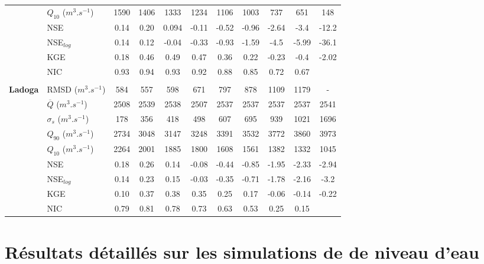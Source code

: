 \begin{table}[b!]
\begin{tabular*}{\linewidth}{ @{\extracolsep{\fill}} ll *{9}c @{}}
                         & $Q_{10}$ ($m^{3}.s^{-1}$) & 1590 & 1406 & 1333 & 1234 & 1106 & 1003 & 737 & 651 & 148  \\
                         & NSE & 0.14 & 0.20 & 0.094 & -0.11 & -0.52 & -0.96 & -2.64 & -3.4 & -12.2 \\
                         & NSE$_{log}$ & 0.14 & 0.12 & -0.04 & -0.33 & -0.93 & -1.59 & -4.5 & -5.99 & -36.1 \\
                         & KGE & 0.18 & 0.46 & 0.49 & 0.47 & 0.36 & 0.22 & -0.23 & -0.4 & -2.02  \\
                         & NIC&0.93&0.94&0.93&0.92&0.88&0.85&0.72&0.67\\
                         \midrule \addlinespace \\
\multirow{9}{*}{\textbf{Ladoga}} & RMSD ($m^{3}.s^{-1}$) & 584 & 557 & 598 & 671 & 797 & 878 & 1109 & 1179 & - \\
                         & $\overline{Q}$ ($m^{3}.s^{-1}$) & 2508 & 2539 & 2538 & 2507 & 2537 & 2537 & 2537 & 2537 & 2541  \\
                         & $\sigma_{s}$ ($m^{3}.s^{-1}$) & 178 & 356 & 418 & 498 & 607 & 695 & 939 & 1021 & 1696\\
                         & $Q_{90}$ ($m^{3}.s^{-1}$) & 2734 & 3048 & 3147 & 3248 & 3391 & 3532 & 3772 & 3860 & 3973 \\
                         & $Q_{10}$ ($m^{3}.s^{-1}$) & 2264 & 2001 & 1885 & 1800 & 1608 & 1561 & 1382 & 1332 & 1045  \\
                         & NSE & 0.18 & 0.26 & 0.14 & -0.08 & -0.44 & -0.85 & -1.95 & -2.33 & -2.94 \\
                         & NSE$_{log}$ & 0.14 & 0.23 & 0.15 & -0.03 & -0.35 & -0.71 & -1.78 & -2.16 & -3.2\\
                         & KGE & 0.10 & 0.37 & 0.38 & 0.35 & 0.25 & 0.17 & -0.06 & -0.14 & -0.22  \\
                         & NIC&0.79&0.81&0.78&0.73&0.63&0.53&0.25&0.15\\
\bottomrule
\end{tabular*}
\end{table}

\cleardoublepage


\section{{\selectfont Résultats détaillés sur les simulations de de niveau d'eau}}
\label{chap:annexe_h_globe}

